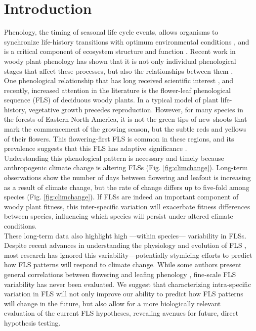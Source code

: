 \documentclass{article}
\begin{document}
\section*{Introduction}
Phenology, the timing of seasonal life cycle events, allows organisms to synchronize life-history transitions with optimum environmental conditions \citep{Forrest2010}, and is a critical component of ecosystem structure and function \citep{Cleland2007,Piao2007}. Recent work in woody plant phenology has shown that it is not only individual phenological stages that affect these processes, but also the relationships between them \citep{Ettinger2018}.\\

\noindent One phenological relationship that has long received scientific interest \citep[see][]{Robertson1895}, and recently, increased attention in the literature \citep{Savage2019, Gougherty2018} is the flower-leaf phenological sequence (FLS) of deciduous woody plants. In a typical model of plant life-history, vegetative growth precedes reproduction. However, for many species in the forests of Eastern North America, it is not the green tips of new shoots that mark the commencement of the growing season, but the subtle reds and yellows of their flowers. This flowering-first FLS is common in these regions, and its prevalence suggests that this FLS has adaptive significance \citep{Rathcke_1985}.\\ 

\noindent Understanding this phenological pattern is necessary and timely because anthropogenic climate change is altering FLSs (Fig. \ref{fig:climchange}). Long-term observations show the number of days between flowering and leafout is increasing as a result of climate change, but the rate of change differs up to five-fold among species (Fig. \ref{fig:climchange}).  If FLSs are indeed an important component of woody plant fitness, this inter-specific variation will exacerbate fitness differences between species, influencing which species will persist under altered climate conditions.\\

\noindent These long-term data also highlight high ---within species--- variability in FLSs. Despite recent advances in understanding the physiology and evolution of FLS \citep{Gougherty2018,Savage2019}, most research has ignored this variability---potentially stymieing efforts to predict how FLS patterns will respond to climate change. While some authors present general correlations between flowering and leafing phenology \citep{Lechowicz_1995, Ettinger2018}, fine-scale FLS variability has never been evaluated. We suggest that characterizing intra-specific variation in FLS will not only improve our ability to predict how FLS patterns will change in the future, but also allow for a more biologically relevant evaluation of the current FLS hypotheses, revealing avenues for future, direct hypothesis testing.\\
\end{document}
